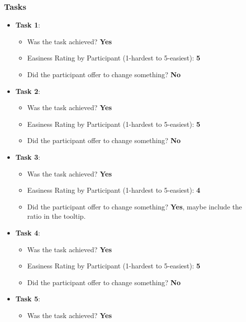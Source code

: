 \documentclass[twocolumn, letterpaper,13pt]{scrartcl}
\begin{document}
    \subsubsection*{Tasks}
    \begin{itemize}
        \item \textbf{Task 1}:
        \begin{itemize}
            \item Was the task achieved? \textbf{Yes}
            \item Easiness Rating by Participant (1-hardest to 5-easiest): \textbf{5}
            \item Did the participant offer to change something? \textbf{No}
        \end{itemize}
        \item \textbf{Task 2}:
        \begin{itemize}
            \item Was the task achieved? \textbf{Yes}
            \item Easiness Rating by Participant (1-hardest to 5-easiest): \textbf{5}
            \item Did the participant offer to change something? \textbf{No}
        \end{itemize}
        \item \textbf{Task 3}:
        \begin{itemize}
            \item Was the task achieved? \textbf{Yes}
            \item Easiness Rating by Participant (1-hardest to 5-easiest): \textbf{4}
            \item Did the participant offer to change something? \textbf{Yes}, maybe include the ratio in the tooltip.
        \end{itemize}
        \item \textbf{Task 4}:
        \begin{itemize}
            \item Was the task achieved? \textbf{Yes}
            \item Easiness Rating by Participant (1-hardest to 5-easiest): \textbf{5}
            \item Did the participant offer to change something? \textbf{No}
        \end{itemize}
        \item \textbf{Task 5}:
        \begin{itemize}
            \item Was the task achieved? \textbf{Yes}

\end{itemize}
\end{itemize}
\end{document}
